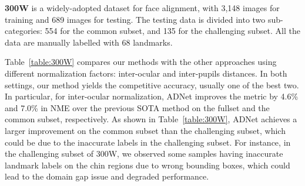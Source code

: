\documentclass[10pt,twocolumn,letterpaper]{article}
\begin{document}
\vspace{5pt}
\noindent\textbf{300W} \cite{sagonas2013300} is a widely-adopted dataset for face alignment, with 3,148 images for training and 689 images for testing. The testing data is divided into two sub-categories: 554 for the common subset, and 135 for the challenging subset. All the data are manually labelled with 68 landmarks.

Table~\ref{table:300W} compares our methods with the other approaches using different normalization factors: inter-ocular and inter-pupils distances.
In both settings, our method yields the competitive accuracy, usually one of the best two.
In particular, for inter-ocular normalization, ADNet improves the metric by 4.6\% and 7.0\% in NME over the previous SOTA method on the fullset and the common subset, respectively.
As shown in Table~\ref{table:300W}, ADNet achieves a larger improvement on the common subset than the challenging subset, which could be due to the inaccurate labels in the challenging subset. For instance, in the challenging subset of 300W, we observed some samples having inaccurate landmark labels on the chin regions due to wrong bounding boxes, which could lead to the domain gap issue and degraded performance.
\end{document}
